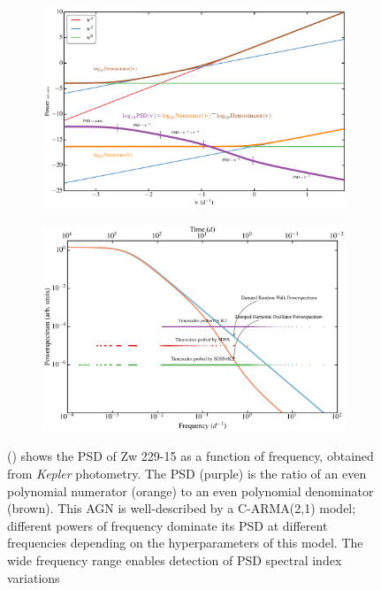 \begin{figure}
  \begin{subfigure}[t]{0.5\textwidth}
    \centering\includegraphics[width=0.9\linewidth]{figs/agn/AGN_Variability_01.pdf}
    \centering
    \caption{}
    \label{fig:PSDvsFreq}
  \end{subfigure}
  \begin{subfigure}[t]{0.5\textwidth}
    \centering\includegraphics[width=0.9\linewidth]{figs/agn/PowerOfSDSSK2.jpg}
    \centering
    \caption{}
    \label{fig:SDSSK2Power}
  \end{subfigure}
  \caption{() shows the PSD of Zw 229-15 as a function of frequency,
  obtained from {\em Kepler} photometry. The PSD (purple) is the ratio of an even 
  polynomial numerator (orange) to an even polynomial denominator (brown). 
  This AGN is well-described by a C-ARMA(2,1) model; different powers of frequency 
  dominate its PSD at different frequencies depending on the hyperparameters of 
  this model. The wide frequency range enables detection of PSD spectral index variations 
}
\end{figure}

